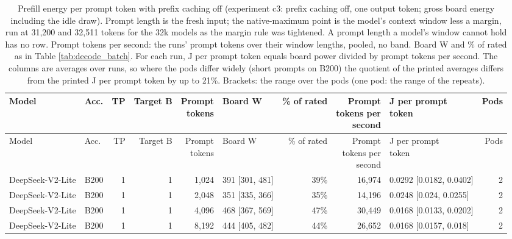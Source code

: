 \begin{landscape}
\begingroup
\scriptsize
\setlength{\tabcolsep}{3pt}
\begin{longtable}{llrrrlrrlr}
\caption{Prefill energy per prompt token with prefix caching off (experiment c3: prefix caching off, one output token; gross board energy including the idle draw). Prompt length is the fresh input; the native-maximum point is the model's context window less a margin, run at 31,200 and 32,511 tokens for the 32k models as the margin rule was tightened. A prompt length a model's window cannot hold has no row. Prompt tokens per second: the runs' prompt tokens over their window lengths, pooled, no band. Board W and \% of rated as in Table \ref{tab:decode_batch}. For each run, J per prompt token equals board power divided by prompt tokens per second. The columns are averages over runs, so where the pods differ widely (short prompts on B200) the quotient of the printed averages differs from the printed J per prompt token by up to 21\%. Brackets: the range over the pods (one pod: the range of the repeats).}\label{tab:prefill}\\
\toprule
Model & Acc. & TP & Target B & \makecell[r]{Prompt\\tokens} & Board W & \% of rated & \makecell[r]{Prompt\\tokens per\\second} & \makecell[l]{J per prompt\\token} & Pods \\
\midrule
\endfirsthead
\toprule
Model & Acc. & TP & Target B & \makecell[r]{Prompt\\tokens} & Board W & \% of rated & \makecell[r]{Prompt\\tokens per\\second} & \makecell[l]{J per prompt\\token} & Pods \\
\midrule
\endhead
\bottomrule
\endfoot
DeepSeek-V2-Lite & B200 & 1 & 1 & 1,024 & 391 {[}301, 481{]} & 39\% & 16,974 & 0.0292 {[}0.0182, 0.0402{]} & 2 \\
DeepSeek-V2-Lite & B200 & 1 & 1 & 2,048 & 351 {[}335, 366{]} & 35\% & 14,196 & 0.0248 {[}0.024, 0.0255{]} & 2 \\
DeepSeek-V2-Lite & B200 & 1 & 1 & 4,096 & 468 {[}367, 569{]} & 47\% & 30,449 & 0.0168 {[}0.0133, 0.0202{]} & 2 \\
DeepSeek-V2-Lite & B200 & 1 & 1 & 8,192 & 444 {[}405, 482{]} & 44\% & 26,652 & 0.0168 {[}0.0157, 0.018{]} & 2 \\

\end{longtable}
\end{landscape}
